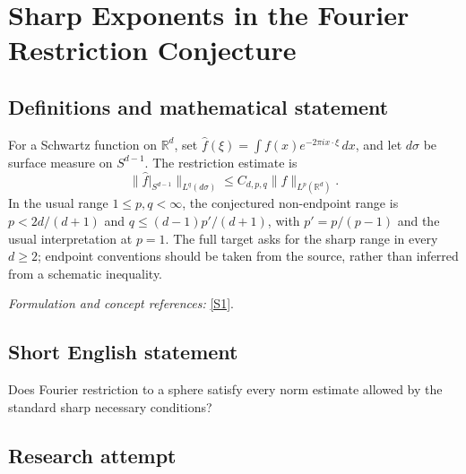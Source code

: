 \documentclass[11pt,a4paper]{article}
\newcommand{\R}{\mathbb{R}}
\newcommand{\sref}[2]{\hyperlink{source:#1:#2}{[S#2]}}
\newif\ifshowcatalogue
\newcommand{\cataloguescope}[1]{\ifshowcatalogue
 \paragraph{Exact scope in the supplied catalogue.}
 \begin{quote}\small #1\end{quote}\fi}
\numberwithin{equation}{section}
\begin{document}
\setcounter{section}{0}
\clearpage
\section*{\texorpdfstring{Sharp Exponents in the Fourier Restriction Conjecture}{Sharp Exponents in the Fourier Restriction Conjecture}}\label{30003539}
\subsection{Definitions and mathematical statement}
For a Schwartz function on $\R^d$, set $\widehat f(\xi)=\int f(x)e^{-2\pi i x\cdot\xi}\,dx$, and let $d\sigma$ be surface measure on $S^{d-1}$. The restriction estimate is
\[
 \|\widehat f|_{S^{d-1}}\|_{L^q(d\sigma)}\le C_{d,p,q}\|f\|_{L^p(\R^d)}.
\]
In the usual range $1\le p,q<\infty$, the conjectured non-endpoint range is $p<2d/(d+1)$ and $q\le (d-1)p'/(d+1)$, with $p'=p/(p-1)$ and the usual interpretation at $p=1$. The full target asks for the sharp range in every $d\ge2$; endpoint conventions should be taken from the source, rather than inferred from a schematic inequality.
\par\smallskip\textit{Formulation and concept references:} \sref{30003539}{1}.
\cataloguescope{Prove the conjectured sharp L\textasciicircum{}p(R\textasciicircum{}d)-to-L\textasciicircum{}q(S\textasciicircum{}\{d-1\}) boundedness range for restriction of the Fourier transform to the unit sphere in every dimension d at least 2, including the non-endpoint range specified by the standard Knapp necessary conditions.}
\subsection{Short English statement}
Does Fourier restriction to a sphere satisfy every norm estimate allowed by the standard sharp necessary conditions?
\subsection{Research attempt}
\end{document}
